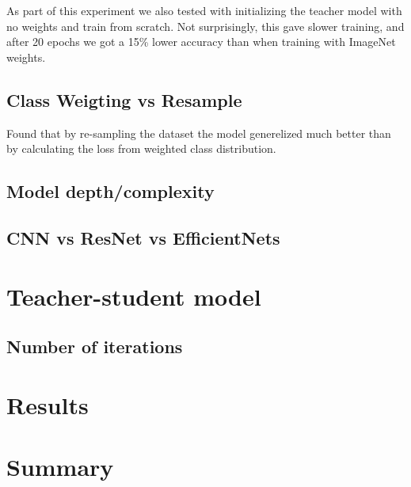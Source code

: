 \documentclass[thesis.tex]{subfiles}
\begin{document}

As part of this experiment we also tested with initializing the teacher model with no weights and train from scratch. Not surprisingly, this gave slower training, and after 20 epochs we got a 15\% lower accuracy than when training with ImageNet weights.



\subsection{Class Weigting vs Resample}
Found that by re-sampling the dataset the model generelized much better than by calculating the loss from weighted class distribution.



\subsection{Model depth/complexity}




\subsection{CNN vs ResNet vs EfficientNets}





\section{Teacher-student model}


\subsection{Number of iterations}



\section{Results} \label{sec:C4-results}






\section{Summary} \label{sec:C4-summary}
\end{document}
